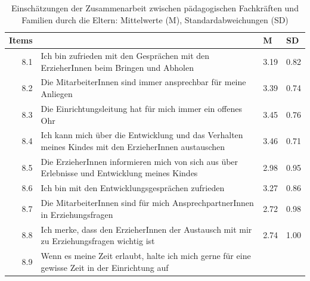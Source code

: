 \documentclass[12pt,a4paper]{article}
\begin{document}
\begin{table}[h]
\label{tab_mean}
\caption{Einschätzungen der Zusammenarbeit zwischen pädagogischen Fachkräften und Familien durch die Eltern: Mittelwerte (M), Standardabweichungen (SD)}
\begin{tabularx}{\textwidth}{rXll}
\hline 
Items&
& M& 
           SD\\\hline  
8.1& Ich bin zufrieden mit den Gesprächen mit den ErzieherInnen
      beim Bringen und Abholen                                                                                                                                                                                                             &
 3.19&  
           0.82   \\      
8.2& Die MitarbeiterInnen sind immer ansprechbar für meine   
      Anliegen                                                                                                                                                &
 3.39&
           0.74\\
8.3& Die Einrichtungsleitung hat für mich immer ein offenes Ohr &             
 3.45&
           0.76\\
8.4& Ich kann mich über die Entwicklung und das Verhalten
      meines Kindes mit den ErzieherInnen austauschen                                                                                             &
 3.46&
           0.71\\
8.5 &Die ErzieherInnen informieren mich von sich aus über
      Erlebnisse und Entwicklung meines Kindes                                                                                                                                         &
 2.98&
           0.95\\
8.6& Ich bin mit den Entwicklungsgesprächen zufrieden                                          &
 3.27&
          0.86\\
8.7& Die MitarbeiterInnen sind für mich AnsprechpartnerInnen in             
      Erziehungsfragen                                                                                   &
 2.72&
          0.98\\
8.8& Ich merke, dass den ErzieherInnen der Austausch mit mir zu
      Erziehungsfragen wichtig ist                                                                 &
 2.74&
          1.00\\
8.9& Wenn es meine Zeit erlaubt, halte ich mich gerne für eine
      gewisse Zeit in der Einrichtung auf                                                                                                                  &

\end{tabularx}
\end{table}
\end{document}
